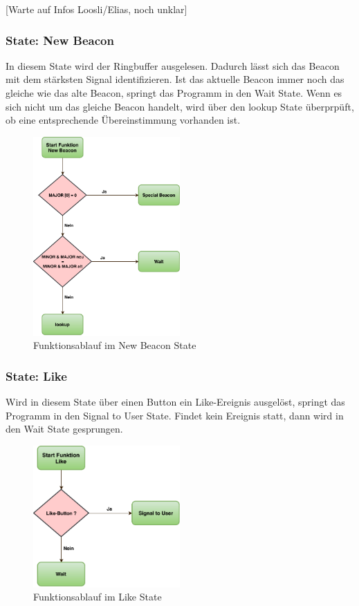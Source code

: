 [Warte auf Infos Loosli/Elias, noch unklar]

\subsubsection*{State: New Beacon}

In diesem State wird der Ringbuffer ausgelesen. Dadurch lässt sich das Beacon mit dem stärksten Signal identifizieren. Ist das aktuelle Beacon immer noch das gleiche wie das alte Beacon, springt das Programm in den Wait State. Wenn es sich nicht um das gleiche Beacon handelt, wird über den lookup State überprpüft, ob eine entsprechende Übereinstimmung vorhanden ist.

\begin{figure}[htbp!!!!]
	\centering
	\includegraphics[width=0.5\textwidth]{Data/NewBeacon_picture.pdf}
	\caption[Statemachine: New Beacon]{Funktionsablauf im New Beacon State}
	\label{fig:newBeaconState}
\end{figure} 

\subsubsection*{State: Like}

Wird in diesem State über einen Button ein Like-Ereignis ausgelöst, springt das Programm in den Signal to User State. Findet kein Ereignis statt, dann wird in den Wait State gesprungen.

\begin{figure}[htbp!!!!]
	\centering
	\includegraphics[width=0.5\textwidth]{Data/Like_picture.pdf}
	\caption[Statemachine: Like]{Funktionsablauf im Like State}
	\label{fig:likeState}
\end{figure} 

